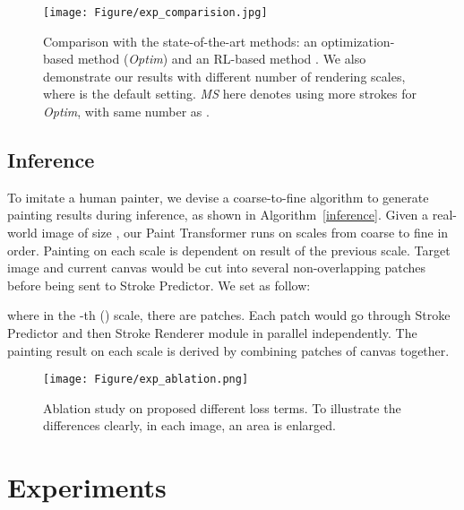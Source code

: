 \documentclass[10pt,twocolumn,letterpaper]{article}
\begin{document}
\begin{figure*}[t]
\begin{center}
\texttt{[image: Figure/exp\_comparision.jpg]}
\end{center}
   \caption{Comparison with the state-of-the-art methods: an optimization-based method (\emph{Optim}) \cite{zou2020stylized} and an RL-based method \cite{huang2019learning}. We also demonstrate our results with different number of rendering scales, where  is the default setting. \emph{MS} here denotes using more strokes for \emph{Optim}, with same number as \emph{} .}
\label{fig:comparison_optim}
\end{figure*}

\subsection{Inference}
To imitate a human painter, we devise a coarse-to-fine algorithm to generate painting results during inference, as shown in Algorithm~\ref{inference}. 
Given a real-world image of size , our Paint Transformer runs on  scales from coarse to fine in order.
Painting on each scale is dependent on result of the previous scale. 
Target image and current canvas would be cut into several non-overlapping  patches before being sent to Stroke Predictor.
We set  as follow:

where in the -th () scale, there are  patches. 
Each patch would go through Stroke Predictor and then Stroke Renderer module in parallel independently. 
The painting result on each scale is derived by combining patches of canvas together. 

\begin{figure*}[t]
\begin{center}
\texttt{[image: Figure/exp\_ablation.png]}
\end{center}
\vspace{-0.5cm}
   \caption{Ablation study on proposed different loss terms. To illustrate the differences clearly, in each image, an area is enlarged.}
   \vspace{-0.2cm}
\label{fig:exp_ablation}
\end{figure*}

\section{Experiments}
\end{document}
